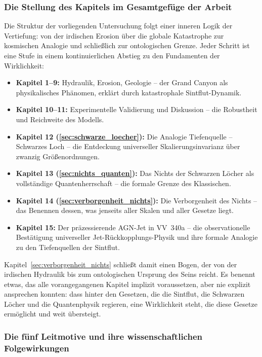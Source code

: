 ﻿\documentclass[12pt,a4paper]{report}
\begin{document}
\subsubsection{Die Stellung des Kapitels im Gesamtgefüge der Arbeit}

Die Struktur der vorliegenden Untersuchung folgt einer inneren Logik der Vertiefung: von der irdischen Erosion über die globale Katastrophe zur kosmischen Analogie und schließlich zur ontologischen Grenze. Jeder Schritt ist eine Stufe in einem kontinuierlichen Abstieg zu den Fundamenten der Wirklichkeit:

\begin{itemize}
	\item \textbf{Kapitel 1--9:} Hydraulik, Erosion, Geologie -- der Grand Canyon als physikalisches Phänomen, erklärt durch katastrophale Sintflut-Dynamik.
	\item \textbf{Kapitel 10--11:} Experimentelle Validierung und Diskussion -- die Robustheit und Reichweite des Modells.
	\item \textbf{Kapitel 12 (\ref{sec:schwarze_loecher}):} Die Analogie Tiefenquelle -- Schwarzes Loch -- die Entdeckung universeller Skalierungsinvarianz über zwanzig Größenordnungen.
	\item \textbf{Kapitel 13 (\ref{sec:nichts_quanten}):} Das Nichts der Schwarzen Löcher als vollständige Quantenherrschaft -- die formale Grenze des Klassischen.
	\item \textbf{Kapitel 14 (\ref{sec:verborgenheit_nichts}):} Die Verborgenheit des Nichts -- das Benennen dessen, was jenseits aller Skalen und aller Gesetze liegt.
	\item \textbf{Kapitel 15:} Der präzessierende AGN-Jet in VV~340a -- die observationelle Bestätigung universeller Jet-Rückkopplungs-Physik und ihre formale Analogie zu den Tiefenquellen der Sintflut.
\end{itemize}

Kapitel~\ref{sec:verborgenheit_nichts} schließt damit einen Bogen, der von der irdischen Hydraulik bis zum ontologischen Ursprung des Seins reicht. Es benennt etwas, das alle vorangegangenen Kapitel implizit voraussetzen, aber nie explizit ansprechen konnten: dass hinter den Gesetzen, die die Sintflut, die Schwarzen Löcher und die Quantenphysik regieren, eine Wirklichkeit steht, die diese Gesetze ermöglicht und weit übersteigt.

\subsubsection{Die fünf Leitmotive und ihre wissenschaftlichen Folgewirkungen}
\end{document}
